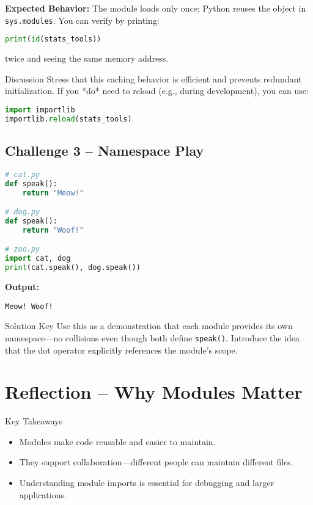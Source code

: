 \documentclass[12pt]{article}
\begin{document}
\textbf{Expected Behavior:} The module loads only once; Python reuses the object in \texttt{sys.modules}.  
You can verify by printing:
\begin{lstlisting}[language=Python]
print(id(stats_tools))
\end{lstlisting}
twice and seeing the same memory address.

\begin{teacherbox}{Discussion}
Stress that this caching behavior is efficient and prevents redundant initialization.  
If you *do* need to reload (e.g., during development), you can use:
\begin{lstlisting}[language=Python]
import importlib
importlib.reload(stats_tools)
\end{lstlisting}
\end{teacherbox}

\subsection*{Challenge 3 – Namespace Play}
\begin{lstlisting}[language=Python]
# cat.py
def speak():
    return "Meow!"

# dog.py
def speak():
    return "Woof!"

# zoo.py
import cat, dog
print(cat.speak(), dog.speak())
\end{lstlisting}

\textbf{Output:}
\begin{lstlisting}
Meow! Woof!
\end{lstlisting}

\begin{teacherbox}{Solution Key}
Use this as a demonstration that each module provides its own namespace—no collisions even though both define \texttt{speak()}.  
Introduce the idea that the dot operator explicitly references the module’s scope.
\end{teacherbox}

\section{Reflection – Why Modules Matter}

\begin{reflectionbox}{Key Takeaways}
\begin{itemize}
  \item Modules make code reusable and easier to maintain.
  \item They support collaboration—different people can maintain different files.
  \item Understanding module imports is essential for debugging and larger applications.
\end{itemize}
\end{reflectionbox}
\end{document}
